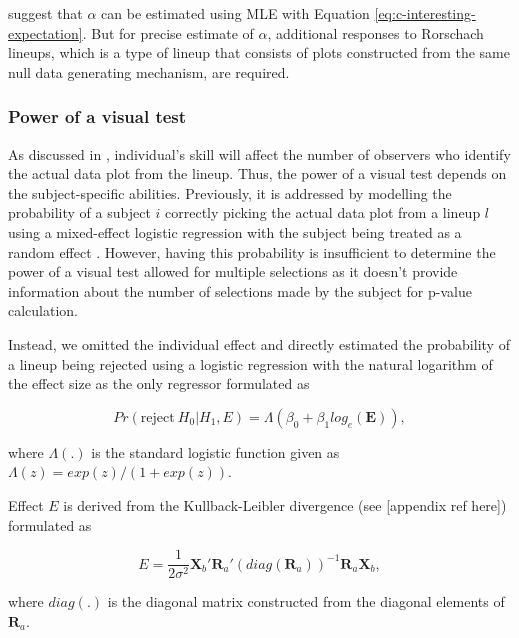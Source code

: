 \documentclass[]{interact}
\theoremstyle{plain}%
\theoremstyle{definition}
\theoremstyle{remark}
\begin{document}
\citet{vanderplas2021statistical} suggest that \(\alpha\) can be
estimated using MLE with Equation \ref{eq:c-interesting-expectation}.
But for precise estimate of \(\alpha\), additional responses to
Rorschach lineups, which is a type of lineup that consists of plots
constructed from the same null data generating mechanism, are required.

\hypertarget{power-of-a-visual-test}{%
\subsubsection{Power of a visual test}\label{power-of-a-visual-test}}

As discussed in \citet{majumder_validation_2013}, individual's skill
will affect the number of observers who identify the actual data plot
from the lineup. Thus, the power of a visual test depends on the
subject-specific abilities. Previously, it is addressed by modelling the
probability of a subject \(i\) correctly picking the actual data plot
from a lineup \(l\) using a mixed-effect logistic regression with the
subject being treated as a random effect
\citep{majumder_validation_2013}. However, having this probability is
insufficient to determine the power of a visual test allowed for
multiple selections as it doesn't provide information about the number
of selections made by the subject for p-value calculation.

Instead, we omitted the individual effect and directly estimated the
probability of a lineup being rejected using a logistic regression with
the natural logarithm of the effect size as the only regressor
formulated as

\begin{equation} \label{eq:logistic-regression-1-1}
Pr(\text{reject}~H_0|H_1,E) = \Lambda(\beta_0 + \beta_1 log_e(\boldsymbol{E})),
\end{equation}

\noindent where \(\Lambda(.)\) is the standard logistic function given
as \(\Lambda(z) = exp(z)/(1+exp(z))\).

Effect \(E\) is derived from the Kullback-Leibler divergence (see
{[}appendix ref here{]}) formulated as

\begin{equation} \label{eq:effect-size-ex1}
E = \frac{1}{2\sigma^2}\boldsymbol{X}_b'\boldsymbol{R}_a'(diag(\boldsymbol{R}_a))^{-1}\boldsymbol{R}_a\boldsymbol{X}_b,
\end{equation}

\noindent where \(diag(.)\) is the diagonal matrix constructed from the
diagonal elements of \(\boldsymbol{R}_a\).
\end{document}

